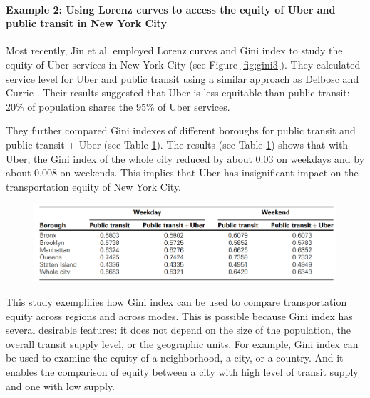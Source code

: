 \documentclass[11pt]{article}
\begin{document}
\paragraph{Example 2: Using Lorenz curves to access the equity of Uber and public transit in New York City}
Most recently, Jin et al. \cite{jin2019uber} employed Lorenz curves and Gini index to study the equity of Uber services in New York City (see Figure \ref{fig:gini3}).  They calculated service level for Uber and public transit using a similar approach as Delbosc and Currie \cite{delbosc2011using}. Their results suggested that Uber is less equitable than public transit: 20\% of population shares the 95\% of Uber services. 

They further compared Gini indexes of different boroughs for public transit and public transit + Uber (see Table \ref{fig:gini4}). The results (see Table \ref{fig:gini4}) shows that with Uber, the Gini index of the whole city reduced by about 0.03 on weekdays and by about 0.008 on weekends. This implies that Uber has insignificant impact on the transportation equity of New York City. 


\begin{figure}[tb]
  \centering
  \includegraphics[width=0.8\linewidth]{gini4.png}
  \label{fig:gini4}
\end{figure}

This study exemplifies how Gini index can be used to compare transportation equity across regions and across modes. This is possible because Gini index has several desirable features:  it does not depend on the size of the population, the overall transit supply level, or the geographic units. For example, Gini index can be used to examine the equity of a neighborhood, a city, or a country. And it enables the comparison of equity between a city with high level of transit supply and one with low supply. 
\end{document}
